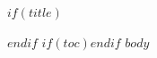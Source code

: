 \documentclass[UTF8,a4paper,12pt]{ctexart}
\begin{document}
$if(title)$\maketitle$endif$
$if(toc)$\tableofcontents\newpage$endif$
$body$
\end{document}
